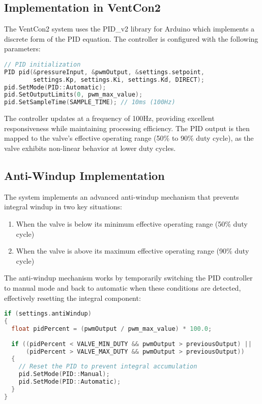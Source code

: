 \documentclass[a4paper,11pt]{article}
\begin{document}
\subsection{Implementation in VentCon2}

The VentCon2 system uses the PID\_v2 library for Arduino which implements a discrete form of the PID equation. The controller is configured with the following parameters:

\begin{lstlisting}[language=C++, caption=PID Configuration]
// PID initialization
PID pid(&pressureInput, &pwmOutput, &settings.setpoint, 
        settings.Kp, settings.Ki, settings.Kd, DIRECT);
pid.SetMode(PID::Automatic);
pid.SetOutputLimits(0, pwm_max_value);
pid.SetSampleTime(SAMPLE_TIME); // 10ms (100Hz)
\end{lstlisting}

The controller updates at a frequency of 100Hz, providing excellent responsiveness while maintaining processing efficiency. The PID output is then mapped to the valve's effective operating range (50\% to 90\% duty cycle), as the valve exhibits non-linear behavior at lower duty cycles.

\subsection{Anti-Windup Implementation}

The system implements an advanced anti-windup mechanism that prevents integral windup in two key situations:

\begin{enumerate}
    \item When the valve is below its minimum effective operating range (50\% duty cycle)
    \item When the valve is above its maximum effective operating range (90\% duty cycle)
\end{enumerate}

The anti-windup mechanism works by temporarily switching the PID controller to manual mode and back to automatic when these conditions are detected, effectively resetting the integral component:

\begin{lstlisting}[language=C++, caption=Anti-Windup Implementation]
if (settings.antiWindup) 
{
  float pidPercent = (pwmOutput / pwm_max_value) * 100.0;
  
  if ((pidPercent < VALVE_MIN_DUTY && pwmOutput > previousOutput) ||
      (pidPercent > VALVE_MAX_DUTY && pwmOutput > previousOutput)) 
  {
    // Reset the PID to prevent integral accumulation
    pid.SetMode(PID::Manual);
    pid.SetMode(PID::Automatic);
  }
}
\end{lstlisting}
\end{document}
